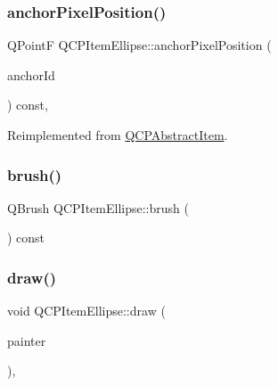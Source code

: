 \subsubsection{\texorpdfstring{anchor\+Pixel\+Position()}{anchorPixelPosition()}}
{\footnotesize\ttfamily Q\+PointF Q\+C\+P\+Item\+Ellipse\+::anchor\+Pixel\+Position (\begin{DoxyParamCaption}\item[{int}]{anchor\+Id }\end{DoxyParamCaption}) const\hspace{0.3cm}{\ttfamily [protected]}, {\ttfamily [virtual]}}



Reimplemented from \hyperlink{class_q_c_p_abstract_item_ada5bad4e1196c4fc0d0d12328e24b8f2}{Q\+C\+P\+Abstract\+Item}.

\mbox{\label{class_q_c_p_item_ellipse_aacf45d032f204d0df3dd0bfdf1172cd3}} 
\subsubsection{\texorpdfstring{brush()}{brush()}}
{\footnotesize\ttfamily Q\+Brush Q\+C\+P\+Item\+Ellipse\+::brush (\begin{DoxyParamCaption}{ }\end{DoxyParamCaption}) const\hspace{0.3cm}{\ttfamily [inline]}}

\mbox{\label{class_q_c_p_item_ellipse_a77eebd67a402fc496082a2e51356928c}} 
\subsubsection{\texorpdfstring{draw()}{draw()}}
{\footnotesize\ttfamily void Q\+C\+P\+Item\+Ellipse\+::draw (\begin{DoxyParamCaption}\item[{\hyperlink{class_q_c_p_painter}{Q\+C\+P\+Painter} $\ast$}]{painter }\end{DoxyParamCaption})\hspace{0.3cm}{\ttfamily [protected]}, {\ttfamily [virtual]}}



